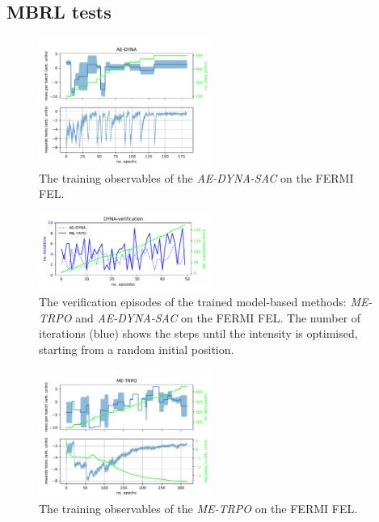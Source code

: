 \documentclass[
reprint,
amsmath,amssymb,amsfonts,clevref,
aps,
prstab,
]{revtex4-2}
\begin{document}
	\subsection{MBRL tests}
	\begin{figure}
		\centering
		\includegraphics*[width=0.5\textwidth]{Figures/AE-DYNA_observables.pdf}
		\caption{The training observables of the \emph{AE-DYNA-SAC} on the FERMI FEL.}
		\label{fig:AE-DYNA_observables}
	\end{figure}
	
	\begin{figure}
		\centering
		\includegraphics*[width=0.5\textwidth]{Figures/Verification_DYNA_all_episodes.pdf}
		\caption{The verification episodes of the trained model-based methods: \emph{ME-TRPO} and \emph{AE-DYNA-SAC} on the FERMI FEL. The number of iterations (blue) shows the steps until the intensity is optimised, starting from a random initial position.}
		\label{fig:AE-DYNA_verification}
	\end{figure}
	
	
	\begin{figure}
		\centering
		\includegraphics*[width=0.5\textwidth]{Figures/ME-TRPO_observables.pdf}
		\caption{The training observables of the \emph{ME-TRPO} on the FERMI FEL.}
		\label{fig:ME-TRPO_observables}
	\end{figure}
	
\end{document}
